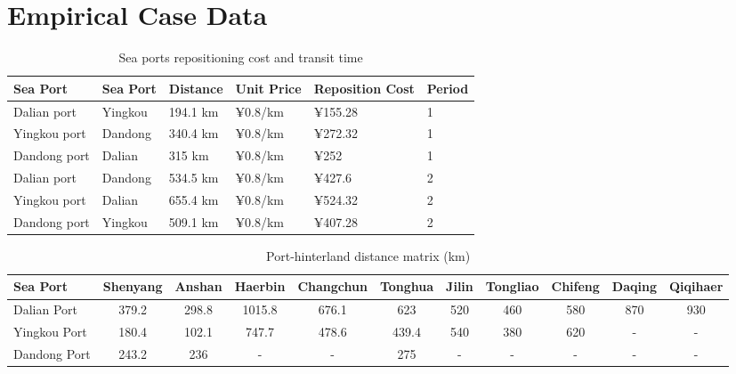 \documentclass[preprint,12pt]{elsarticle}
\begin{document}
\newpage
\section{Empirical Case Data}\label{app2}

\begin{table}[htbp]
\centering
\caption{Sea ports repositioning cost and transit time}
\label{tab:seaport_repositioning}
\small
\setlength{\tabcolsep}{4pt}
\begin{tabular}{llllll}
\hline
Sea Port & Sea Port & Distance & Unit Price & Reposition Cost & Period \\
\hline
Dalian port & Yingkou & 194.1 km & ¥0.8/km & ¥155.28 & 1 \\
Yingkou port & Dandong & 340.4 km & ¥0.8/km & ¥272.32 & 1 \\
Dandong port & Dalian & 315 km & ¥0.8/km & ¥252 & 1 \\
Dalian port & Dandong & 534.5 km & ¥0.8/km & ¥427.6 & 2 \\
Yingkou port & Dalian & 655.4 km & ¥0.8/km & ¥524.32 & 2 \\
Dandong port & Yingkou & 509.1 km & ¥0.8/km & ¥407.28 & 2 \\
\hline
\end{tabular}
\end{table}

\begin{table}
\centering
\caption{Port-hinterland distance matrix (km)}
\label{tab:port_hinterland_distance}
\small
\setlength{\tabcolsep}{4pt}
\begin{tabular}{l*{10}{c}}
\hline
Sea Port & Shenyang & Anshan & Haerbin & Changchun & Tonghua & Jilin & Tongliao & Chifeng & Daqing & Qiqihaer \\
\hline
Dalian Port & 379.2 & 298.8 & 1015.8 & 676.1 & 623 & 520 & 460 & 580 & 870 & 930 \\
Yingkou Port & 180.4 & 102.1 & 747.7 & 478.6 & 439.4 & 540 & 380 & 620 & - & - \\
Dandong Port & 243.2 & 236 & - & - & 275 & - & - & - & - & - \\
\hline
\end{tabular}
\end{table}
\end{document}
